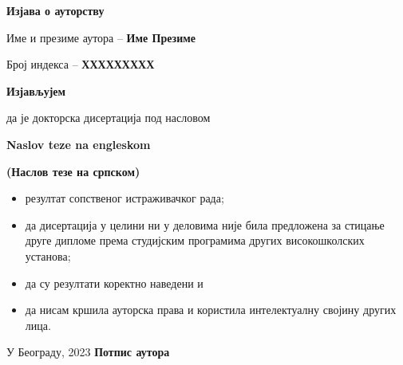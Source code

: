 
\cleardoublepage

\thispagestyle{empty}
\setlength{\parindent}{0pt}

\renewcommand{\headrulewidth}{0pt}


\normalsize

\mbox{}
\vspace{1cm}


\begin{center}
\begin{Large}\textbf{Изјава о ауторству}
\end{Large}\end{center}

\vspace{1.5cm}

Име и презиме аутора -- \textbf{Име Презиме}

Број индекса -- \textbf{ХХХХХХХХХ}

\vspace{.7cm}

\begin{center}
\textbf{Изјављујем}            \end{center}

да је докторска дисертација под насловом 


\textbf{ Naslov teze na engleskom}


\textbf{(Наслов тезе на српском)}

\begin{itemize}
 \item резултат сопственог истраживачког рада;
\item  да дисертација у целини 
ни у деловима није била предложена за стицање друге дипломе према студијским 
програмима других високошколских установа;
\item да су резултати коректно наведени и 
\item да нисам кршила ауторска права и користила интелектуалну својину 
других лица.
\end{itemize}

\vfill
 
У Београду, \hspace{1cm} 2023  \hfill  \textbf{Потпис
аутора\hspace{2cm}\mbox{}}

\vspace{.5cm}
\hspace{10cm}\hrulefill 

\hspace{\fill}

\let\cleardoublepage\clearpage

